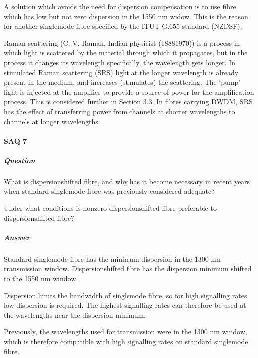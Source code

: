 \documentclass[letterpaper,10pt,english]{sphinxmanual}
\begin{document}
A solution which avoids the need for dispersion compensation is to use fibre which has low but not zero dispersion in the 1550 nm widow. This is the reason for another single\sphinxhyphen{}mode fibre specified by the ITU\sphinxhyphen{}T G.655 standard \textendash{}  (NZ\sphinxhyphen{}DSF).

Raman scattering (C. V. Raman, Indian physicist (1888\textendash{}1970)) is a process in which light is scattered by the material through which it propagates, but in the process it changes its wavelength \textendash{} specifically, the wavelength gets longer. In stimulated Raman scattering (SRS) light at the longer wavelength is already present in the medium, and increases (stimulates) the scattering. The ‘pump’ light is injected at the amplifier to provide a source of power for the amplification process. This is
considered further in Section 3.3. In fibres carrying DWDM, SRS has the effect of transferring power from channels at shorter wavelengths to channels at longer wavelengths.


\paragraph{SAQ 7}
\label{\detokenize{content/session_00/Part_00_02:SAQ-7}}

\subparagraph{Question}
\label{\detokenize{content/session_00/Part_00_02:id25}}
What is dispersion\sphinxhyphen{}shifted fibre, and why has it become necessary in recent years when standard single\sphinxhyphen{}mode fibre was previously considered adequate?

Under what conditions is non\sphinxhyphen{}zero dispersion\sphinxhyphen{}shifted fibre preferable to dispersion\sphinxhyphen{}shifted fibre?


\subparagraph{Answer}
\label{\detokenize{content/session_00/Part_00_02:id26}}
Standard single\sphinxhyphen{}mode fibre has the minimum dispersion in the 1300 nm transmission window. Dispersion\sphinxhyphen{}shifted fibre has the dispersion minimum shifted to the 1550 nm window.

Dispersion limits the bandwidth of single\sphinxhyphen{}mode fibre, so for high signalling rates low dispersion is required. The highest signalling rates can therefore be used at the wavelengths near the dispersion minimum.

Previously, the wavelengths used for transmission were in the 1300 nm window, which is therefore compatible with high signalling rates on standard single\sphinxhyphen{}mode fibre.
\end{document}
